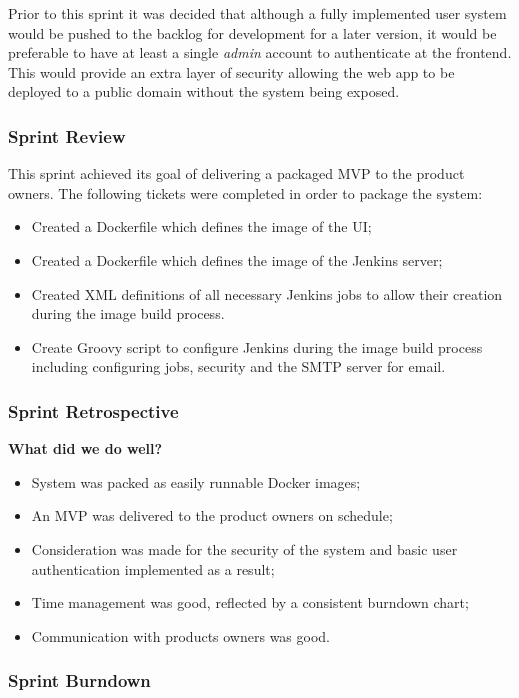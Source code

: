   Prior to this sprint it was decided that although a fully implemented user system would be pushed to the backlog for development for a later version, it would be preferable to have at least a single \textit{admin} account to authenticate at the frontend. This would provide an extra layer of security allowing the web app to be deployed to a public domain without the system being exposed.
  
  \subsubsection{Sprint Review}
  This sprint achieved its goal of delivering a packaged MVP to the product owners. The following tickets were completed in order to package the system:
  
  \begin{itemize}
    \item Created a Dockerfile which defines the image of the UI;
    \item Created a Dockerfile which defines the image of the Jenkins server;
    \item Created XML definitions of all necessary Jenkins jobs to allow their creation during the image build process.
    \item Create Groovy script to configure Jenkins during the image build process including configuring jobs, security and the SMTP server for email.
  \end{itemize}
  
  \subsubsection{Sprint Retrospective}
  \textbf{What did we do well?}
  \begin{itemize}
    \item System was packed as easily runnable Docker images;
    \item An MVP was delivered to the product owners on schedule;
    \item Consideration was made for the security of the system and basic user authentication implemented as a result;
    \item Time management was good, reflected by a consistent burndown chart;
    \item Communication with products owners was good.
  \end{itemize}
  
  \subsubsection{Sprint Burndown}
  
